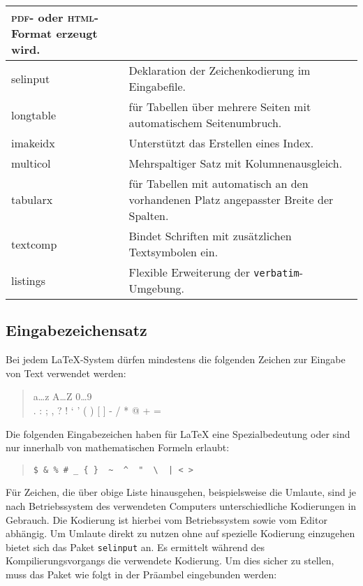 \begin{longtable}[c]{@{}>{\raggedright\arraybackslash\ttfamily}p{2.2cm}%
                         p{}@{}}
 \textsc{pdf}- oder \textsc{html}-Format erzeugt wird.
\\\midrule
 selinput & 
 Deklaration der Zeichenkodierung im Eingabefile.
\\\midrule
 longtable &
 für Tabellen über mehrere Seiten mit automatischem Seitenumbruch.
\\\midrule
 imakeidx & 
 Unterstützt das Erstellen eines Index.
\\\midrule
 multicol & 
 Mehrspaltiger Satz mit Kolumnenausgleich.
\\\midrule
 tabularx & 
 für Tabellen mit automatisch an den vorhandenen Platz angepasster Breite der 
 Spalten.
\\\midrule
 textcomp & 
 Bindet Schriften mit zusätzlichen Textsymbolen ein.
 \\\midrule
 listings & Flexible Erweiterung der \texttt{verbatim}-Umgebung.
\\\bottomrule
\end{longtable}


\subsection{Eingabezeichensatz}\label{inputenc}

Bei jedem \LaTeX-System dürfen mindestens die folgenden Zeichen zur Eingabe von 
Text verwendet werden:
\begin{quote}
  \ttfamily
  a\dots z A\dots Z 0\dots 9 \\
  . : ; , ? ! ` ' ( ) [ ] - / * @ + =
\end{quote}
Die folgenden Eingabezeichen haben für \LaTeX{} eine Spezialbedeutung oder sind 
nur innerhalb von mathematischen Formeln erlaubt:
\begin{quote}
\verb.$ & % # _ { }  ~  ^  "  \  | < >.
\end{quote}
Für Zeichen, die über obige Liste hinausgehen, beispielsweise die Umlaute, sind 
je nach Betriebssystem des verwendeten Computers unterschiedliche Kodierungen in
Gebrauch. Die Kodierung ist hierbei vom Betriebssystem sowie vom Editor 
abhängig. Um Umlaute direkt zu nutzen ohne auf spezielle Kodierung einzugehen
bietet sich das Paket \texttt{selinput} an. Es ermittelt während des 
Kompilierungsvorgangs die verwendete Kodierung. Um dies sicher zu stellen, muss
das Paket wie folgt in der Präambel eingebunden werden:
\begin{example}[caption={Bestimmung der Kodierung für die Nutzung von Umlauten},]
 \usepackage{selinput}
 \usepackage[T1]{fontenc}%
\end{example}

